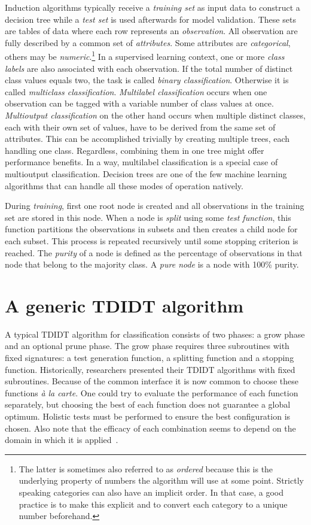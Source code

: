 Induction algorithms typically receive a \emph{training set} as input data to construct a decision tree while a \emph{test set} is used afterwards for model validation. These sets are tables of data where each row represents an \emph{observation}. All observation are fully described by a common set of \emph{attributes}. Some attributes are \emph{categorical}, others may be \emph{numeric}.\footnote{The latter is sometimes also referred to as \emph{ordered} because this is the underlying property of numbers the algorithm will use at some point. Strictly speaking categories can also have an implicit order. In that case, a good practice is to make this explicit and to convert each category to a unique number beforehand.} In a supervised learning context, one or more \emph{class labels} are also associated with each observation. If the total number of distinct class values equals two, the task is called \emph{binary classification}. Otherwise it is called \emph{multiclass classification}. \emph{Multilabel classification} occurs when one observation can be tagged with a variable number of class values at once. \emph{Multioutput classification} on the other hand occurs when multiple distinct classes, each with their own set of values, have to be derived from the same set of attributes. This can be accomplished trivially by creating multiple trees, each handling one class. Regardless, combining them in one tree might offer performance benefits. In a way, multilabel classification is a special case of multioutput classification. Decision trees are one of the few machine learning algorithms that can handle all these modes of operation natively.

During \emph{training}, first one root node is created and all observations in the training set are stored in this node. When a node is \emph{split} using some \emph{test function}, this function partitions the observations in subsets and then creates a child node for each subset. This process is repeated recursively until some stopping criterion is reached. The \emph{purity} of a node is defined as the percentage of observations in that node that belong to the majority class. A \emph{pure node} is a node with 100\% purity.

\section{A generic TDIDT algorithm}
A typical TDIDT algorithm for classification consists of two phases: a grow phase and an optional prune phase. The grow phase requires three subroutines with fixed signatures: a test generation function, a splitting function and a stopping function. Historically, researchers presented their TDIDT algorithms with fixed subroutines. Because of the common interface it is now common to choose these functions \emph{\`{a} la carte}. One could try to evaluate the performance of each function separately, but choosing the best of each function does not guarantee a global optimum. Holistic tests must be performed to ensure the best configuration is chosen. Also note that the efficacy of each combination seems to depend on the domain in which it is applied~\cite{mingers1989empirical}.

